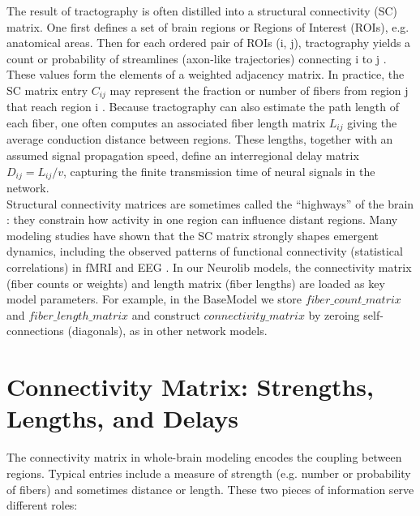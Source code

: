 \documentclass[11pt,a4paper]{article}
\begin{document}
The result of tractography is often distilled into a structural connectivity (SC) matrix. One first defines a
set of brain regions or Regions of Interest (ROIs), e.g. anatomical areas. Then for each ordered pair of ROIs
(i, j), tractography yields a count or probability of streamlines (axon-like trajectories) connecting i to j \cite{jimenezmarin2024open}. These
values form the elements of a weighted adjacency matrix. In practice, the SC matrix entry $C_{ij}$ may
represent the fraction or number of fibers from region j that reach region i \cite{honey2007network}. Because tractography can
also estimate the path length of each fiber, one often computes an associated fiber length matrix $L_{ij}$
giving the average conduction distance between regions. These lengths, together with an assumed signal
propagation speed, define an interregional delay matrix $D_{ij}=L_{ij}/v$, capturing the finite transmission
time of neural signals in the network.\\

Structural connectivity matrices are sometimes called the “highways” of the brain \cite{sporns2005human}: they constrain how activity in one region can influence distant regions. Many modeling studies have shown that the SC matrix strongly shapes emergent dynamics, including the observed patterns of functional connectivity (statistical correlations) in 
fMRI and EEG \cite{honey2007network,deco2009key,breakspear2017dynamic}. In our Neurolib models, the connectivity matrix (fiber counts or weights) and length matrix (fiber lengths) are loaded as key model parameters. For example, in the BaseModel we store $fiber\_count\_matrix$ and $fiber\_length\_matrix$ and construct $connectivity\_matrix$ by zeroing self-connections (diagonals), as in other network models.

\section{Connectivity Matrix: Strengths, Lengths, and Delays}

The connectivity matrix in whole-brain modeling encodes the coupling between regions. Typical entries
include a measure of strength (e.g. number or probability of fibers) and sometimes distance or length. These
two pieces of information serve different roles:\\
\end{document}
